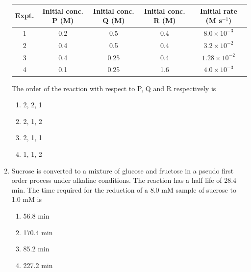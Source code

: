 \documentclass[journal,12pt,onecolumn]{IEEEtran}
\theoremstyle{remark}
\begin{document}
\begin{enumerate}
\begin{center}
\begin{tabular}{|c|c|c|c|c|}
\hline
Expt. & Initial conc. P (M) & Initial conc. Q (M) & Initial conc. R (M) & Initial rate (M s$^{-1}$) \\
\hline
1 & 0.2 & 0.5 & 0.4 & $8.0 \times 10^{-3}$ \\
2 & 0.4 & 0.5 & 0.4 & $3.2 \times 10^{-2}$ \\
3 & 0.4 & 0.25 & 0.4 & $1.28 \times 10^{-2}$ \\
4 & 0.1 & 0.25 & 1.6 & $4.0 \times 10^{-3}$ \\
\hline
\end{tabular}
\end{center}

The order of the reaction with respect to P, Q and R respectively is

\begin{multicols}{2}
\begin{enumerate}[label={}, leftmargin=*, itemsep=0pt]
 \item   2, 2, 1
 \item   2, 1, 2
 \item   2, 1, 1
 \item   1, 1, 2
\end{enumerate}
\end{multicols}
  

\item  Sucrose is converted to a mixture of glucose and fructose in a pseudo first order process under alkaline conditions. The reaction has a half life of 28.4 min. The time required for the reduction of a 8.0 mM sample of sucrose to 1.0 mM is \hfill{}

\begin{multicols}{2}
\begin{enumerate}[label={}, leftmargin=*, itemsep=0pt]
 \item   56.8 min
 \item   170.4 min
 \item   85.2 min
 \item   227.2 min
\end{enumerate}
\end{multicols}
  


\end{enumerate}
\end{document}

